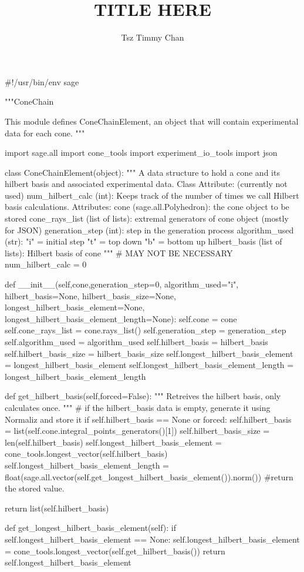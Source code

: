 \documentclass{TC}
\title{TITLE HERE}	%
\author{Tsz Timmy Chan}	%
\begin{document}
\begin{SAGE}
#!/usr/bin/env sage

"""ConeChain

This module defines ConeChainElement, an object that will contain experimental data for each cone.
"""

import sage.all
import cone_tools
import experiment_io_tools
import json 


class ConeChainElement(object):
	""" A data structure to hold a cone and its hilbert basis
	and associated experimental data.
	Class Attribute:
		(currently not used) num_hilbert_calc (int): Keeps track of the number of times we call Hilbert basis calculations.
	Attributes:
		cone (sage.all.Polyhedron): the cone object to be stored
		cone_rays_list (list of lists):	extremal generators of cone object (mostly for JSON)
		generation_step (int):		step in the generation process
		algorithm_used (str):		"i" = initial step
			"t" = top down
			"b" = bottom up
		hilbert_basis (list of lists): Hilbert basis of cone
	"""
	# MAY NOT BE NECESSARY num_hilbert_calc = 0

	def __init__(self,cone,generation_step=0, algorithm_used="i", 
				hilbert_basis=None, hilbert_basis_size=None,
				longest_hilbert_basis_element=None,
				longest_hilbert_basis_element_length=None):
		self.cone = cone
		self.cone_rays_list = cone.rays_list()
		self.generation_step = generation_step
		self.algorithm_used = algorithm_used
		self.hilbert_basis = hilbert_basis
		self.hilbert_basis_size = hilbert_basis_size
		self.longest_hilbert_basis_element = longest_hilbert_basis_element
		self.longest_hilbert_basis_element_length = longest_hilbert_basis_element_length

	def get_hilbert_basis(self,forced=False):
		""" Retreives the hilbert basis, only calculates once. """
		# if the hilbert_basis data is empty, generate it using Normaliz and store it
		if self.hilbert_basis == None or forced:
			self.hilbert_basis = list(self.cone.integral_points_generators()[1])
			self.hilbert_basis_size = len(self.hilbert_basis)
			self.longest_hilbert_basis_element = cone_tools.longest_vector(self.hilbert_basis)
			self.longest_hilbert_basis_element_length = float(sage.all.vector(self.get_longest_hilbert_basis_element()).norm())
		#return the stored value.

		return list(self.hilbert_basis)

	def get_longest_hilbert_basis_element(self):
		if self.longest_hilbert_basis_element == None:
			self.longest_hilbert_basis_element =  cone_tools.longest_vector(self.get_hilbert_basis())
		return self.longest_hilbert_basis_element


\end{SAGE}
\end{document}
